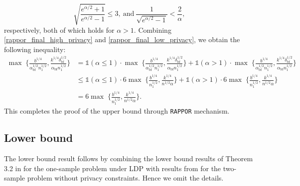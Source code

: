 \documentclass[twoside,11pt]{article}
\newcommand{\normSqMultinomMax}{b}
\newcommand{\alphabetSize}{k} %
\newcommand{\sampleSize}{n}
\newcommand{\privacyParameter}{\alpha} %
\newcommand{\privacyParameterrappor}{\privacyParameter_{\mathrm{bf}}}
\newcommand{\smallNumber}{\delta}
\newcommand{\smallNumberrappor}{\smallNumber_{\mathrm{bf}}}
\begin{document}
\begin{appendix}
\begin{itemize}
	\begin{equation*}
		\sqrt{\frac{e^{\alpha/2}+1}{e^{\alpha/2}-1}}
		\leq 3,~\text{and}~
		\frac{1}{\sqrt{e^{\privacyParameter/2}-1}} < \frac{2}{\privacyParameter}
		,
	\end{equation*}
	respectively, both of which holds for $\privacyParameter>1$.
	Combining \eqref{rappor_final_high_privacy} and \eqref{rappor_final_low_privacy}, we obtain the following inequality:
	\begin{align*}
		\max \;
		\biggl\{
		\frac{
			\normSqMultinomMax^{1/4}
		}{
			\privacyParameterrappor^{1/2}
			\sampleSize_1^{1/2}}
		,
		\frac{
			\alphabetSize^{1/4}
			\smallNumberrappor^{1/2} 
		}{
			\privacyParameterrappor
			\sampleSize_1^{1/2}}
		\biggr\}
		&=
		\mathds{1}(\alpha \leq 1) \cdot
		\max \;
		\biggl\{
		\frac{
			\normSqMultinomMax^{1/4}
		}{
			\privacyParameterrappor^{1/2}
			\sampleSize_1^{1/2}}
		,
		\frac{
			\alphabetSize^{1/4}
			\smallNumberrappor^{1/2} 
		}{
			\privacyParameterrappor
			\sampleSize_1^{1/2}}
		\biggr\}
		+
		\mathds{1}(\alpha > 1) \cdot
		\max \;
		\biggl\{
		\frac{
			\normSqMultinomMax^{1/4}
		}{
			\privacyParameterrappor^{1/2}
			\sampleSize_1^{1/2}}
		,
		\frac{
			\alphabetSize^{1/4}
			\smallNumberrappor^{1/2} 
		}{
			\privacyParameterrappor
			\sampleSize_1^{1/2}}
		\biggr\}
		\\&\leq
		\mathds{1}(\alpha \leq 1) \cdot
		6
		\max \;
		\biggl\{
		\frac{b^{1/4}}{\sampleSize_1^{1/2}},
		\frac{k^{1/4}}{
			n^{1/2}
			\privacyParameter
		}
		\biggr\}
		+
		\mathds{1}(\alpha > 1) \cdot
		6
		\max \;
		\biggl\{
		\frac{b^{1/4}}{\sampleSize_1^{1/2}},
		\frac{k^{1/4}}{
			n^{1/2}
			\privacyParameter
		}
		\biggr\}
		\\&=
		6
		\max \;
		\biggl\{
		\frac{b^{1/4}}{\sampleSize_1^{1/2}},
		\frac{k^{1/4}}{
			n^{1/2}
			\privacyParameter
		}
		\biggr\}.
	\end{align*}
	This completes the proof of the upper bound through \texttt{RAPPOR} mechanism.
\end{itemize}
	
	\subsection{Lower bound}
	The lower bound result follows by combining the lower bound results of Theorem 3.2 in \citep{Lam-Weil2021MinimaxConstraint} for the one-sample problem under LDP with results from \citep{chan2014optimal,kim_minimax_2022} for the two-sample problem without privacy constraints. Hence we omit the details. 
	

\end{appendix}
\end{document}
